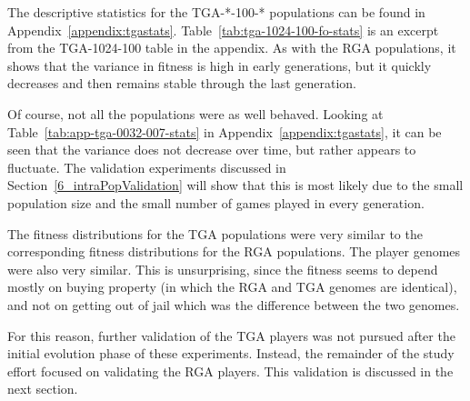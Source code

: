The descriptive statistics for the TGA-*-100-* populations can be found in
Appendix~\ref{appendix:tgastats}. Table~\ref{tab:tga-1024-100-fo-stats} is an
excerpt from the TGA-1024-100 table in the appendix. As with the RGA
populations, it shows that the variance in fitness is high in early generations,
but it quickly decreases and then remains stable through the last generation.

\begin{table}[htbp]
  \centering
  \caption[TGA-1024-100-FO Statistics]{Descriptive Statistics for the TGA-1024-100-FO Population}
  \label{tab:tga-1024-100-fo-stats}%
\end{table}%

Of course, not all the populations were as well behaved. Looking at
Table~\ref{tab:app-tga-0032-007-stats} in Appendix~\ref{appendix:tgastats}, it
can be seen that the variance does not decrease over time, but rather appears to
fluctuate. The validation experiments discussed in
Section~\ref{6_intraPopValidation} will show that this is most likely due to the
small population size and the small number of games played in every generation.

The fitness distributions for the TGA populations were very similar to the
corresponding fitness distributions for the RGA populations. The player genomes
were also very similar. This is unsurprising, since the fitness seems to depend
mostly on buying property (in which the RGA and TGA genomes are identical), and
not on getting out of jail which was the difference between the two genomes.

For this reason, further validation of the TGA players was not pursued after
the initial evolution phase of these experiments. Instead, the remainder of the
study effort focused on validating the RGA players. This validation is discussed
in the next section.

